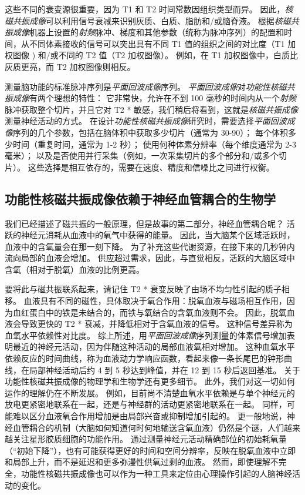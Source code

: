 这些不同的衰变源很重要，因为 T1 和 T2 时间常数因组织类型而异。 
因此，\textit{核磁共振成像}可以利用信号衰减来识别灰质、白质、脂肪和/或脑脊液。 
根据\textit{核磁共振成像}机器上设置的\textit{射频}脉冲、梯度和其他参数（统称为脉冲序列）的配置和时间，从不同体素接收的信号可以突出具有不同 T1 值的组织之间的对比度（T1 加权图像 ) 和/或不同的 T2 值（T2 加权图像）。 
例如，在 T1 加权图像中，白质比灰质更亮，而 T2 加权图像则相反。


测量脑功能的标准脉冲序列是\textit{平面回波成像}序列。 
\textit{平面回波成像}对\textit{功能性核磁共振成像}有两个理想的特性：
它非常快，允许在不到 100 毫秒的时间内从一个\textit{射频}脉冲获取整个切片，并且它对 T2 * 敏感，我们稍后将看到，这就是\textit{核磁共振成像}测量神经活动的方式。
在设计\textit{功能性核磁共振成像}研究时，需要选择\textit{平面回波成像}序列的几个参数，包括在脑体积中获取多少切片（通常为 30-90）；
每个体积多少时间（重复时间，通常为 1-2 秒）；
使用何种体素分辨率（每个维度通常为 2-3 毫米）； 
以及是否使用并行采集（例如，一次采集切片的多个部分和/或多个切片）。
这些选择是相互依存的，需要在速度、精度和信噪比之间进行权衡。



\subsection{功能性核磁共振成像依赖于神经血管耦合的生物学}

我们已经描述了磁共振的一般原理，但是故事的第二部分，神经血管耦合呢？
活跃的神经元消耗从血液中的氧气中获得的能量。 
因此，当大脑某个区域活跃时，血液中的含氧量会在那一刻下降。
为了补充这些代谢资源，在接下来的几秒钟内流向局部的血液会增加。
供应超过需求，因此，与直觉相反，活跃的大脑区域中含氧（相对于脱氧）血液的比例更高。


要将此与磁共振联系起来，请记住 T2 * 衰变反映了由场不均匀性引起的质子相移。 
血液具有不同的磁性，具体取决于氧合作用：脱氧血液与磁场相互作用，因为血红蛋白中的铁是未结合的，而铁与氧结合的含氧血液则不会。
因此，脱氧血液会导致更快的 T2 * 衰减，并降低相对于含氧血液的信号。
这种信号差异称为血氧水平依赖性对比度。 
综上所述，用\textit{平面回波成像}序列测量的体素信号增加表明最近的神经元活动，因为伴随这种活动的局部血液氧相对增加。
这种血氧水平依赖反应的时间曲线，称为血液动力学响应函数，看起来像一条长尾巴的钟形曲线，在局部神经活动后约 4 到 5 秒达到峰值，并在 12 到 15 秒后返回基准。
关于功能性核磁共振成像的物理学和生物学还有更多细节。 
此外，我们对这一切如何运作的理解仍在不断发展。 
例如，目前尚不清楚血氧水平依赖是与单个神经元的放电更紧密地联系在一起，还是与神经群的活动更紧密地联系在一起。
同样，可能难以区分血液氧合作用增加是由局部兴奋或抑制增加引起的。 
更一般地说，神经血管耦合的机制（大脑如何知道何时何地输送含氧血液）仍然是个谜，人们越来越关注星形胶质细胞的功能作用。 
通过测量神经元活动精确部位的初始耗氧量（“初始下降”），也有可能获得更好的时间和空间分辨率，反映在脱氧血液中立即和局部上升，而不是延迟和更多弥漫性供氧过剩的血液。 
然而，即使理解不完全，功能性核磁共振成像也可以作为一种工具来定位由心理操作引起的人脑神经活动的变化。



